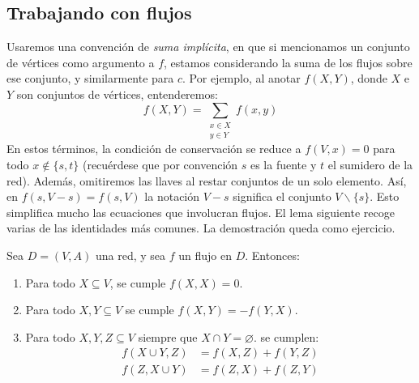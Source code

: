 \subsection{Trabajando con flujos}
\label{sec:trabajando-flujos}

  Usaremos una convención de \emph{suma implícita},%
  en que si mencionamos un conjunto de vértices
  como argumento a \(f\),
  estamos considerando la suma de los flujos sobre ese conjunto,
  y similarmente para \(c\).
  Por ejemplo,
  al anotar \(f(X, Y)\),
  donde \(X\) e \(Y\) son conjuntos de vértices,
  entenderemos:
  \begin{equation*}
    f(X, Y) = \sum_{\substack{
		      x \in X \\
		      y \in Y
		   }} f(x, y)
  \end{equation*}
  En estos términos,
  la condición de conservación
  se reduce a \(f(V, x) = 0\) para todo \(x \notin \{s, t\}\)
  (recuérdese que por convención
   \(s\) es la fuente y \(t\) el sumidero de la red).
  Además,
  omitiremos las llaves al restar conjuntos de un solo elemento.
  Así,
  en \(f(s, V - s) = f(s, V)\)
  la notación
  \(V - s\) significa el conjunto \(V \smallsetminus \{s\}\).
  Esto simplifica mucho las ecuaciones que involucran flujos.
  El lema siguiente recoge varias de las identidades más comunes.
  La demostración queda como ejercicio.
  \begin{lemma}
    \label{lem:identidades}
    Sea \(D = (V, A)\) una red,
    y sea \(f\) un flujo en \(D\).
    Entonces:
    \begin{enumerate}
    \item
      Para todo \(X \subseteq V\),
      se cumple \(f(X, X) = 0\).
    \item
      Para todo \(X, Y \subseteq V\)
      se cumple \(f(X, Y) = - f(Y, X)\).
    \item
      Para todo \(X, Y, Z \subseteq V\) siempre que
      \(X \cap Y = \varnothing\).
      se cumplen:
      \begin{align*}
	f(X \cup Y, Z)
	  &= f(X, Z) + f(Y, Z) \\
	f(Z, X \cup Y)
	  &= f(Z, X) + f(Z, Y)
      \end{align*}
    \end{enumerate}
  \end{lemma}

